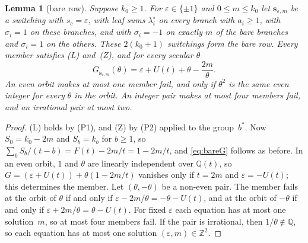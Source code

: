 \documentclass[11pt]{article}
\numberwithin{equation}{section}
\newtheorem{lemma}{Lemma}[section]
\theoremstyle{remark}
\newcommand{\Q}{\mathbb Q}
\newcommand{\Z}{\mathbb Z}
\newcommand{\s}{\mathbf s}
\begin{document}
\begin{lemma}[bare row]\label{lem:barerow}
Suppose $k_0\ge1$. For $\varepsilon\in\{\pm1\}$ and $0\le m\le k_0$ let
$\s_{\varepsilon,m}$ be a switching with $s_c=\varepsilon$, with leaf sums
$\lambda^\circ_i$ on every branch with $a_i\ge1$, with $\sigma_i=1$ on these
branches, and with $\sigma_i=-1$ on exactly $m$ of the bare branches and
$\sigma_i=1$ on the others. These $2(k_0+1)$ switchings form the \emph{bare
row}. Every member satisfies (L) and~(Z), and for every secular $\theta$
\begin{equation}\label{eq:bareG}
 G_{\s_{\varepsilon,m}}(\theta)=\varepsilon+U(t)+\theta-\frac{2m}{\theta}.
\end{equation}
An even orbit makes at most one member fail, and only if $\theta^2$ is the
same even integer for every $\theta$ in the orbit. An integer pair makes at most four members fail, and an
irrational pair at most two.
\end{lemma}
\begin{proof}
(L) holds by (P1), and (Z) by (P2) applied to the group~$b^*$. Now $S_0=k_0-2m$
and $S_b=k_b$ for $b\ge1$, so $\sum_bS_b/(t-b)=F(t)-2m/t=1-2m/t$, and
\eqref{eq:bareG} follows as before. In an even orbit, $1$ and $\theta$ are
linearly independent over $\Q(t)$, so $G=(\varepsilon+U(t))+\theta(1-2m/t)$
vanishes only if $t=2m$ and $\varepsilon=-U(t)$; this determines the member.
Let $(\theta,-\theta)$ be a non-even pair. The member fails at the orbit of
$\theta$ if and only if $\varepsilon-2m/\theta=-\theta-U(t)$, and at the orbit of
$-\theta$ if and only if $\varepsilon+2m/\theta=\theta-U(t)$. For fixed
$\varepsilon$ each equation has at most one solution~$m$, so at most four
members fail. If the pair is irrational, then $1/\theta\notin\Q$, so each
equation has at most one solution $(\varepsilon,m)\in\Z^2$.
\end{proof}
\end{document}
